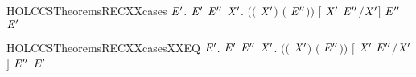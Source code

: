 \begin{SaveVerbatim}{HOLCCSTheoremsRECXXcases}
\HOLTokenTurnstile{} \HOLSymConst{\HOLTokenForall{}}   \ensuremath{\HOLBoundVar{E}\sp{\prime{}}}.
        \HOLTokenTransBegin{}\HOLTokenTransEnd \ensuremath{\HOLBoundVar{E}\sp{\prime{}}} \HOLSymConst{\HOLTokenImp{}}
     \HOLSymConst{\HOLTokenExists{}}\ensuremath{\HOLBoundVar{E}\sp{\prime{}\prime{}}} \ensuremath{\HOLBoundVar{X}\sp{\prime{}}}.
       \ensuremath{(}\ensuremath{(} \HOLSymConst{\ensuremath{=}} \ensuremath{\HOLBoundVar{X}\sp{\prime{}}}\ensuremath{)} \HOLSymConst{\HOLTokenConj{}} \ensuremath{(} \HOLSymConst{\ensuremath{=}} \ensuremath{\HOLBoundVar{E}\sp{\prime{}\prime{}}}\ensuremath{)}\ensuremath{)} \HOLSymConst{\HOLTokenConj{}} \ensuremath{[} \ensuremath{\HOLBoundVar{X}\sp{\prime{}}} \ensuremath{\HOLBoundVar{E}\sp{\prime{}\prime{}}}\ensuremath{/}\ensuremath{\HOLBoundVar{X}\sp{\prime{}}}\ensuremath{]} \ensuremath{\HOLBoundVar{E}\sp{\prime{}\prime{}}} \HOLTokenTransBegin{}\HOLTokenTransEnd \ensuremath{\HOLBoundVar{E}\sp{\prime{}}}
\end{SaveVerbatim}
\newcommand{\HOLCCSTheoremsRECXXcases}{\UseVerbatim{HOLCCSTheoremsRECXXcases}}
\begin{SaveVerbatim}{HOLCCSTheoremsRECXXcasesXXEQ}
\HOLTokenTurnstile{} \HOLSymConst{\HOLTokenForall{}}   \ensuremath{\HOLBoundVar{E}\sp{\prime{}}}.
        \HOLTokenTransBegin{}\HOLTokenTransEnd \ensuremath{\HOLBoundVar{E}\sp{\prime{}}} \HOLSymConst{\HOLTokenEquiv{}}
     \HOLSymConst{\HOLTokenExists{}}\ensuremath{\HOLBoundVar{E}\sp{\prime{}\prime{}}} \ensuremath{\HOLBoundVar{X}\sp{\prime{}}}.
       \ensuremath{(}\ensuremath{(} \HOLSymConst{\ensuremath{=}} \ensuremath{\HOLBoundVar{X}\sp{\prime{}}}\ensuremath{)} \HOLSymConst{\HOLTokenConj{}} \ensuremath{(} \HOLSymConst{\ensuremath{=}} \ensuremath{\HOLBoundVar{E}\sp{\prime{}\prime{}}}\ensuremath{)}\ensuremath{)} \HOLSymConst{\HOLTokenConj{}} \ensuremath{[} \ensuremath{\HOLBoundVar{X}\sp{\prime{}}} \ensuremath{\HOLBoundVar{E}\sp{\prime{}\prime{}}}\ensuremath{/}\ensuremath{\HOLBoundVar{X}\sp{\prime{}}}\ensuremath{]} \ensuremath{\HOLBoundVar{E}\sp{\prime{}\prime{}}} \HOLTokenTransBegin{}\HOLTokenTransEnd \ensuremath{\HOLBoundVar{E}\sp{\prime{}}}
\end{SaveVerbatim}
